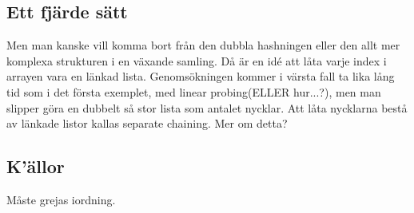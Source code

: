 \documentclass[a5paper,10pt,oneside]{article}
\begin{document}
\subsection*{Ett fjärde sätt}
Men man kanske vill komma bort från den dubbla hashningen eller den allt mer komplexa strukturen i en växande samling. Då är en idé att låta varje index i arrayen vara en länkad lista. Genomsökningen kommer i värsta fall ta lika lång tid som i det första exemplet, med linear probing(ELLER hur...?), men man slipper göra en dubbelt så stor lista som antalet nycklar. Att låta nycklarna bestå av länkade listor kallas separate chaining. Mer om detta?


\subsection*{K'ällor}
Måste grejas iordning.
\end{document}
